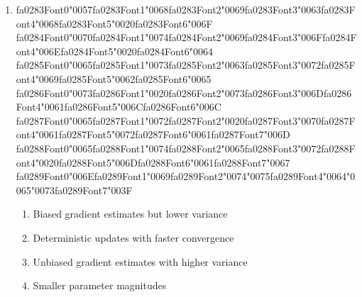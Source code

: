 \documentclass[12pt]{article}
\begin{document}
\begin{enumerate}[label=Q\arabic*.]
 \begin{enumerate}[label=(\Alph*)]
     \item Dropout disabled
     \item The input data has not been normalized
     \item All weights are initialized to zero while biases are non-zero
     \item Learning rate too high
 \end{enumerate}
 
 \item {\csname fa0283Font0\endcsname\char"0057}{\csname fa0283Font1\endcsname\char"0068}{\csname fa0283Font2\endcsname\char"0069}{\csname fa0283Font3\endcsname\char"0063}{\csname fa0283Font4\endcsname\char"0068}{\csname fa0283Font5\endcsname\char"0020}{\csname fa0283Font6\endcsname\char"006F} {\csname fa0284Font0\endcsname\char"0070}{\csname fa0284Font1\endcsname\char"0074}{\csname fa0284Font2\endcsname\char"0069}{\csname fa0284Font3\endcsname\char"006F}{\csname fa0284Font4\endcsname\char"006E}{\csname fa0284Font5\endcsname\char"0020}{\csname fa0284Font6\endcsname\char"0064} {\csname fa0285Font0\endcsname\char"0065}{\csname fa0285Font1\endcsname\char"0073}{\csname fa0285Font2\endcsname\char"0063}{\csname fa0285Font3\endcsname\char"0072}{\csname fa0285Font4\endcsname\char"0069}{\csname fa0285Font5\endcsname\char"0062}{\csname fa0285Font6\endcsname\char"0065} {\csname fa0286Font0\endcsname\char"0073}{\csname fa0286Font1\endcsname\char"0020}{\csname fa0286Font2\endcsname\char"0073}{\csname fa0286Font3\endcsname\char"006D}{\csname fa0286Font4\endcsname\char"0061}{\csname fa0286Font5\endcsname\char"006C}{\csname fa0286Font6\endcsname\char"006C} {\csname fa0287Font0\endcsname\char"0065}{\csname fa0287Font1\endcsname\char"0072}{\csname fa0287Font2\endcsname\char"0020}{\csname fa0287Font3\endcsname\char"0070}{\csname fa0287Font4\endcsname\char"0061}{\csname fa0287Font5\endcsname\char"0072}{\csname fa0287Font6\endcsname\char"0061}{\csname fa0287Font7\endcsname\char"006D} {\csname fa0288Font0\endcsname\char"0065}{\csname fa0288Font1\endcsname\char"0074}{\csname fa0288Font2\endcsname\char"0065}{\csname fa0288Font3\endcsname\char"0072}{\csname fa0288Font4\endcsname\char"0020}{\csname fa0288Font5\endcsname\char"006D}{\csname fa0288Font6\endcsname\char"0061}{\csname fa0288Font7\endcsname\char"0067} {\csname fa0289Font0\endcsname\char"006E}{\csname fa0289Font1\endcsname\char"0069}{\csname fa0289Font2\endcsname\char"0074}{\char"0075}{\csname fa0289Font4\endcsname\char"0064}{\char"0065}{\char"0073}{\csname fa0289Font7\endcsname\char"003F}
 \begin{enumerate}[label=(\Alph*)]
     \item Biased gradient estimates but lower variance
     \item Deterministic updates with faster convergence
     \item Unbiased gradient estimates with higher variance
     \item Smaller parameter magnitudes
 \end{enumerate}
 

\end{enumerate}
\end{document}
